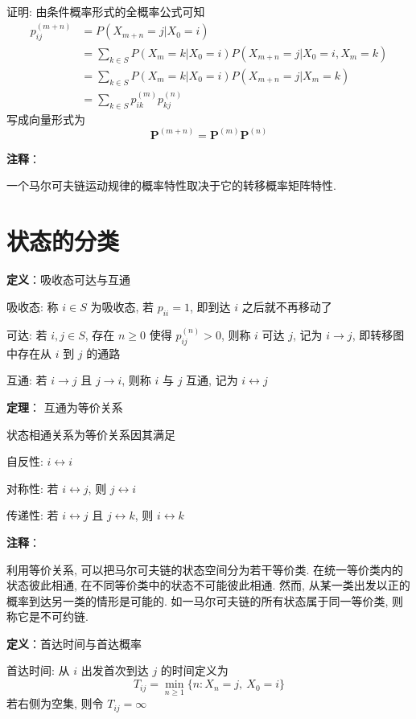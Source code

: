 \documentclass[openany]{ctexbook}
\theoremstyle{kaiti}
\theoremstyle{normal}
\begin{document}
证明: 由条件概率形式的全概率公式可知
\begin{equation}
  \begin{aligned}
    p_{ij}^{(m+n)}&=P(X_{m+n}=j|X_0=i)\\
    &=\sum_{k\in S}P(X_m=k|X_0=i)P(X_{m+n}=j|X_0=i,X_m=k)\\
    &=\sum_{k\in S}P(X_m=k|X_0=i)P(X_{m+n}=j|X_m=k)\\
    &=\sum_{k\in S} p_{ik}^{(m)}p_{kj}^{(n)}
  \end{aligned}
\end{equation} 写成向量形式为
\begin{equation}
  \bm{P}^{(m+n)}=\bm{P}^{(m)}\bm{P}^{(n)}
\end{equation}

\textbf{注释}：

一个马尔可夫链运动规律的概率特性取决于它的转移概率矩阵特性.

\section{状态的分类}

\textbf{定义}：吸收态可达与互通

吸收态: 称 $i\in S$ 为吸收态, 若 $p_{ii}=1$, 即到达 $i$ 之后就不再移动了

可达: 若 $i,j\in S$, 存在 $n\geqslant0$ 使得 $p_{ij}^{(n)}>0$, 则称 $i$ 可达 $j$, 记为 $i\rightarrow j$, 即转移图中存在从 $i$ 到 $j$ 的通路

互通: 若 $i\rightarrow j$ 且 $j\rightarrow i$, 则称 $i$ 与 $j$ 互通, 记为 $i\leftrightarrow j$

\textbf{定理}： 互通为等价关系

状态相通关系为等价关系因其满足

自反性: $i\leftrightarrow i$

对称性: 若 $i\leftrightarrow j$, 则 $j\leftrightarrow i$

传递性: 若 $i\leftrightarrow j$ 且 $j\leftrightarrow k$, 则 $i\leftrightarrow k$

\textbf{注释}：

利用等价关系, 可以把马尔可夫链的状态空间分为若干等价类. 在统一等价类内的状态彼此相通, 在不同等价类中的状态不可能彼此相通. 然而, 从某一类出发以正的概率到达另一类的情形是可能的. 如一马尔可夫链的所有状态属于同一等价类, 则称它是不可约链.

\textbf{定义}：首达时间与首达概率

首达时间: 从 $i$ 出发首次到达 $j$ 的时间定义为
\begin{equation}
  T_{ij}=\min_{n\geqslant1}\{n:X_n=j,~X_0=i\}
\end{equation}
 若右侧为空集, 则令 $T_{ij}=\infty$
\end{document}
